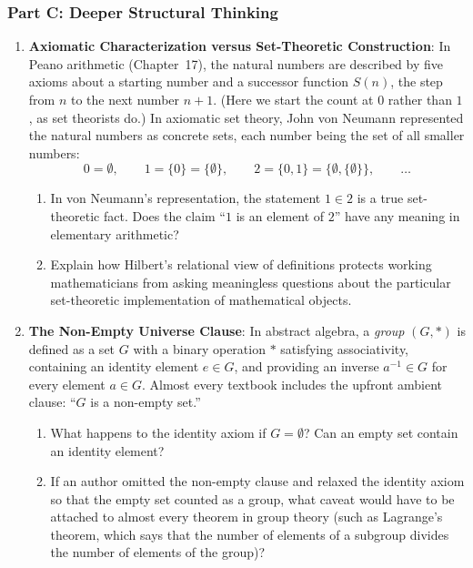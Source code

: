\subsubsection*{Part C: Deeper Structural Thinking}
\begin{enumerate}[resume]
\item \textbf{Axiomatic Characterization versus Set-Theoretic Construction}: In Peano arithmetic (Chapter~17), the natural numbers are described by five axioms about a starting number and a successor function $S(n)$, the step from $n$ to the next number $n + 1$. (Here we start the count at $0$ rather than $1$, as set theorists do.) In axiomatic set theory, John von Neumann represented the natural numbers as concrete sets, each number being the set of all smaller numbers:
\[
0 = \emptyset, \qquad 1 = \{0\} = \{\emptyset\}, \qquad 2 = \{0, 1\} = \bigl\{\emptyset, \{\emptyset\}\bigr\}, \qquad \ldots
\]
\begin{enumerate}[label=(\alph*)]
\item In von Neumann's representation, the statement $1 \in 2$ is a true set-theoretic fact. Does the claim ``$1$ is an element of $2$'' have any meaning in elementary arithmetic?
\item Explain how Hilbert's relational view of definitions protects working mathematicians from asking meaningless questions about the particular set-theoretic implementation of mathematical objects.
\end{enumerate}

\item \textbf{The Non-Empty Universe Clause}: In abstract algebra, a \emph{group} $(G, *)$ is defined as a set $G$ with a binary operation $*$ satisfying associativity, containing an identity element $e \in G$, and providing an inverse $a^{-1} \in G$ for every element $a \in G$. Almost every textbook includes the upfront ambient clause: ``$G$ is a non-empty set.''
\begin{enumerate}[label=(\alph*)]
\item What happens to the identity axiom if $G = \emptyset$? Can an empty set contain an identity element?
\item If an author omitted the non-empty clause and relaxed the identity axiom so that the empty set counted as a group, what caveat would have to be attached to almost every theorem in group theory (such as Lagrange's theorem, which says that the number of elements of a subgroup divides the number of elements of the group)?
\end{enumerate}
\end{enumerate}

\newpage
